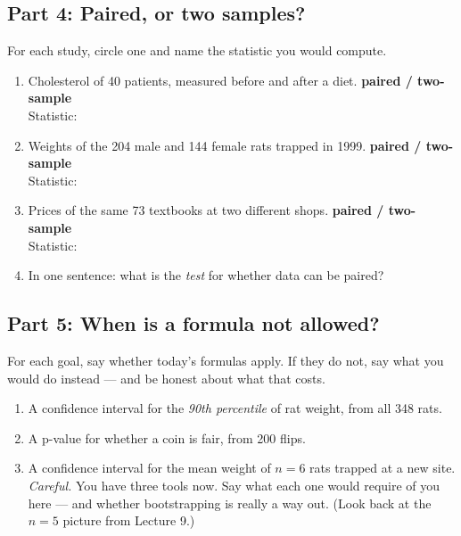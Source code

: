 \documentclass{article}
\newcommand{\blankline}[1]{\underline{\hspace{#1}}}
\begin{document}
\subsection*{Part 4: Paired, or two samples?}
For each study, circle one and name the statistic you would compute.

\begin{enumerate}[label={\bfseries (\Alph*)},itemsep=1em]
\item Cholesterol of 40 patients, measured before and after a diet. \hfill \textbf{paired / two-sample} \\
Statistic: \blankline{3in}
\item Weights of the 204 male and 144 female rats trapped in 1999. \hfill \textbf{paired / two-sample} \\
Statistic: \blankline{3in}
\item Prices of the same 73 textbooks at two different shops. \hfill \textbf{paired / two-sample} \\
Statistic: \blankline{3in}
\item In one sentence: what is the \emph{test} for whether data can be paired? \\[3em]
\end{enumerate}

\subsection*{Part 5: When is a formula not allowed?}
For each goal, say whether today's formulas apply. If they do not, say what you would do instead --- and be honest about what that costs.

\begin{enumerate}[label={\bfseries (\Alph*)},itemsep=.8em]
\item A confidence interval for the \emph{90th percentile} of rat weight, from all 348 rats. \\[3em]
\item A p-value for whether a coin is fair, from 200 flips. \\[3em]
\item A confidence interval for the mean weight of $n = 6$ rats trapped at a new site. \\
\emph{Careful.} You have three tools now. Say what each one would require of you here --- and whether bootstrapping is really a way out. (Look back at the $n=5$ picture from Lecture 9.) \\[5em]
\end{enumerate}
\end{document}
